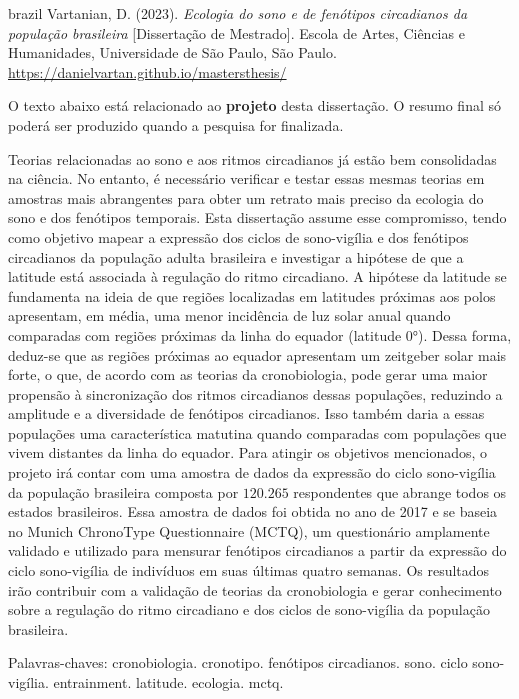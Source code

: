 \documentclass[
  12pt,
  a4paper,
  oneside]{tesesusp}
\begin{document}

\begin{resumo}[RESUMO]
  \begin{otherlanguage*}{brazil}
Vartanian, D. (2023). \emph{Ecologia do sono e de fenótipos circadianos
da população brasileira} {[}Dissertação de Mestrado{]}. Escola de Artes,
Ciências e Humanidades, Universidade de São Paulo, São Paulo.
\url{https://danielvartan.github.io/mastersthesis/}

O texto abaixo está relacionado ao \textbf{projeto} desta dissertação. O
resumo final só poderá ser produzido quando a pesquisa for finalizada.

Teorias relacionadas ao sono e aos ritmos circadianos já estão bem
consolidadas na ciência. No entanto, é necessário verificar e testar
essas mesmas teorias em amostras mais abrangentes para obter um retrato
mais preciso da ecologia do sono e dos fenótipos temporais. Esta
dissertação assume esse compromisso, tendo como objetivo mapear a
expressão dos ciclos de sono-vigília e dos fenótipos circadianos da
população adulta brasileira e investigar a hipótese de que a latitude
está associada à regulação do ritmo circadiano. A hipótese da latitude
se fundamenta na ideia de que regiões localizadas em latitudes próximas
aos polos apresentam, em média, uma menor incidência de luz solar anual
quando comparadas com regiões próximas da linha do equador (latitude
0°). Dessa forma, deduz-se que as regiões próximas ao equador apresentam
um zeitgeber solar mais forte, o que, de acordo com as teorias da
cronobiologia, pode gerar uma maior propensão à sincronização dos ritmos
circadianos dessas populações, reduzindo a amplitude e a diversidade de
fenótipos circadianos. Isso também daria a essas populações uma
característica matutina quando comparadas com populações que vivem
distantes da linha do equador. Para atingir os objetivos mencionados, o
projeto irá contar com uma amostra de dados da expressão do ciclo
sono-vigília da população brasileira composta por \(120.265\)
respondentes que abrange todos os estados brasileiros. Essa amostra de
dados foi obtida no ano de 2017 e se baseia no Munich ChronoType
Questionnaire (MCTQ), um questionário amplamente validado e utilizado
para mensurar fenótipos circadianos a partir da expressão do ciclo
sono-vigília de indivíduos em suas últimas quatro semanas. Os resultados
irão contribuir com a validação de teorias da cronobiologia e gerar
conhecimento sobre a regulação do ritmo circadiano e dos ciclos de
sono-vigília da população brasileira.

Palavras-chaves: cronobiologia. cronotipo. fenótipos circadianos. sono.
ciclo sono-vigília. entrainment. latitude. ecologia. mctq.
  \end{otherlanguage*}
\end{resumo}
\end{document}
